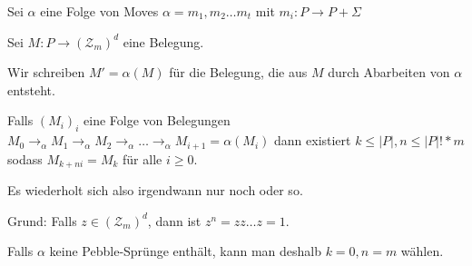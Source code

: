 \begin{lemma}

    Sei $\alpha$ eine Folge von Moves $\alpha = m_1, m_2 \dots m_t$ mit $m_i: P \rightarrow P + \Sigma$


    Sei $M: P \rightarrow (\mathcal{Z}_m)^d$ eine Belegung.

    Wir schreiben $M' = \alpha(M)$ für die Belegung, die aus $M$ durch Abarbeiten von $\alpha$ entsteht.

    Falls $(M_i)_i$ eine Folge von Belegungen
    $M_0 \rightarrow_\alpha M_1 \rightarrow_\alpha M_2 \rightarrow_\alpha \dots \rightarrow_\alpha M_{i+1} = \alpha(M_i)$
    dann existiert $k \leq |P|, n \leq |P|! * m $ sodass $M_{k+ni} = M_k$ für alle $i \geq 0$.

    Es wiederholt sich also irgendwann nur noch oder so.


    Grund: Falls $z \in (\mathcal{Z}_m)^d$, dann ist $z^n = z z \dots z = 1$.

    Falls $\alpha$ keine Pebble-Sprünge enthält, kann man deshalb $k = 0, n = m$ wählen.

\end{lemma}





